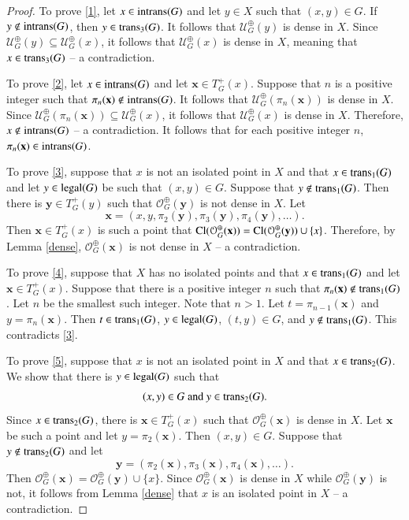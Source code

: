 \documentclass[a4paper,12pt]{article} %
\newcommand{\orbit}{\mathcal{O}^{\oplus}}
\newcommand{\orbitt}{\mathcal{U}^{\oplus}}
\newcommand{\legal}{\textup{legal}}
\newcommand{\tplus}{T^{+}}
\newcommand{\trans}{\textup{trans}}
\newcommand{\intrans}{\textup{intrans}}
\newcommand{\Cl}  {\mathop{\rm Cl}\nolimits}
\begin{document}
\begin{proof}
To prove \ref{1}, let $x\in \intrans(G)$ and let $y\in X$ such that $(x,y)\in G$. If $y\not \in \intrans(G)$, then $y\in \trans_3(G)$. It follows that $\orbitt_G(y)$ is dense in $X$. Since $\orbitt_G(y)\subseteq \orbitt_G(x)$, it follows that $\orbitt_G(x)$ is dense in $X$, meaning that $x\in \trans_3(G)$  -- a  contradiction.

To prove \ref{2}, let $x\in \intrans(G)$ and let $\mathbf x\in \tplus_G(x)$. Suppose that $n$ is a positive integer such that $\pi_n(\mathbf x)\not \in \intrans(G)$. It follows that $\orbitt_G(\pi_n(\mathbf x))$ is dense in $X$.   Since $\orbitt_G(\pi_n(\mathbf x))\subseteq \orbitt_G(x)$, it follows that $\orbitt_G(x)$ is dense in $X$.  Therefore,  $x\not \in \intrans(G)$  -- a  contradiction.  It follows that for each positive integer $n$,  $\pi_n(\mathbf x)\in \intrans(G)$. 



To prove \ref{3}, suppose that $x$ is not an isolated point in $X$ and that $x\in \trans_1(G)$ and let $y\in \legal(G)$ be such that $(x,y)\in G$.  Suppose that $y\not \in \trans_1(G)$. Then there is $\mathbf y\in \tplus_G(y)$ such that $\orbit_G(\mathbf y)$ is not dense in $X$.  Let 
$$
\mathbf x=(x,y,\pi_2(\mathbf y), \pi_3(\mathbf y), \pi_4(\mathbf y), \ldots).
$$
Then $\mathbf x\in \tplus_G(x)$ is such a point that $\Cl(\orbit_G(\mathbf x))=\Cl(\orbit_G(\mathbf y))\cup\{x\}$. Therefore,  by Lemma \ref{dense}, $\orbit_G(\mathbf x)$ is not dense in $X$  -- a  contradiction. 

To prove \ref{4},  suppose that $X$ has no isolated points and that $x\in \trans_1(G)$ and let $\mathbf x\in \tplus_G(x)$. Suppose that there is a positive integer $n$ such that $\pi_n(\mathbf x)\not \in \trans_1(G)$. Let $n$ be the smallest such integer.  Note that $n>1$.  Let $t=\pi_{n-1}(\mathbf x)$ and $y=\pi_{n}(\mathbf x)$.  Then $t\in \trans_1(G)$, $y\in \legal(G)$,  $(t,y)\in G$, and $y\not \in \trans_1(G)$.  This contradicts \ref{3}.  

To prove \ref{5}, suppose that $x$ is not an isolated point in $X$ and that $x\in \trans_2(G)$. We show that there is $y\in \legal(G)$ such that 
$$
(x,y)\in G \textup{ and }  y\in \trans_2(G).
$$
Since $x\in \trans_2(G)$, there is $\mathbf x\in \tplus_G(x)$ such that $\orbit_G(\mathbf x)$ is dense in $X$.  Let $\mathbf x$ be such a point and let $y=\pi_2(\mathbf x)$.  Then  $(x,y)\in G$. Suppose that $y\not \in \trans_2(G)$ and let 
$$
\mathbf y=(\pi_2(\mathbf x), \pi_3(\mathbf x), \pi_4(\mathbf x), \ldots).
$$
Then $\orbit_G(\mathbf x)=\orbit_G(\mathbf y)\cup\{x\}$. Since $\orbit_G(\mathbf x)$ is dense in $X$ while $\orbit_G(\mathbf y)$ is not, it follows from Lemma \ref{dense} that $x$ is an isolated point in $X$  -- a  contradiction.   


\end{proof}
\end{document}

